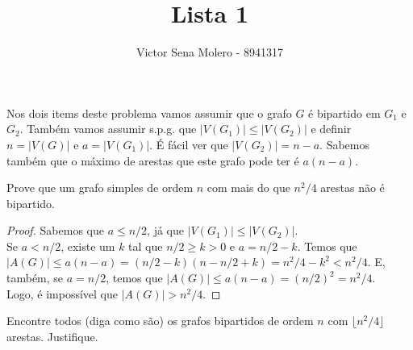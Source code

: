 \documentclass[12pt]{article}
\newenvironment{problem}[2][Ex]{\begin{trivlist}
\item[\hskip \labelsep {\bfseries #1}\hskip \labelsep {\bfseries #2.}]}{\end{trivlist}}
\begin{document}
 
 
\title{Lista 1}
\author{Victor Sena Molero - 8941317}
\maketitle

\begin{problem}{E1}
Nos dois items deste problema vamos assumir que o grafo $G$ é bipartido em $G_1$ e $G_2$. Também vamos assumir s.p.g. que $|V(G_1)| \leq |V(G_2)|$ e definir $n = |V(G)|$ e $a = |V(G_1)|$. É fácil ver que $|V(G_2)| = n - a$. Sabemos também que o máximo de arestas que este grafo pode ter é $a(n-a)$. \\
\end{problem}

\begin{problem}{E1 (a)}
Prove que um grafo simples de ordem $n$ com mais do que $n^2/4$ arestas não é bipartido.
\end{problem}

\begin{proof}
Sabemos que $a \leq n/2$, já que $|V(G_1)| \leq |V(G_2)|$. \\
Se $a < n/2$, existe um $k$ tal que $n/2 \geq k > 0$ e $a = n/2-k$. Temos que $|A(G)| \leq a(n-a) = (n/2-k)(n-n/2+k) = n^2/4 - k^2 < n^2/4$.
E, também, se $a = n/2$, temos que $|A(G)| \leq a(n-a) = (n/2)^2 = n^2/4$. \\
Logo, é impossível que $|A(G)| > n^2/4$.
\end{proof}

\begin{problem}{E1 (b)}
Encontre todos (diga como são) os grafos bipartidos de ordem $n$ com $\lfloor n^2/4 \rfloor$ arestas. Justifique. \\
\end{problem}
\end{document}
